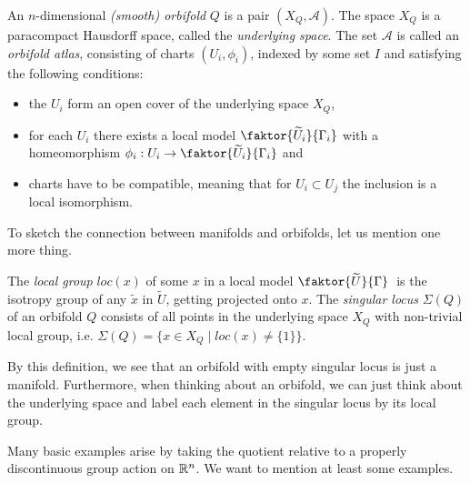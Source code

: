 \begin{definition}
    An \(n\)-dimensional \emph{(smooth) orbifold} \(Q\) is a pair \((X_Q, \mathcal{A})\).
    The space \(X_Q\) is a paracompact Hausdorff space, called the \emph{underlying space}.
    The set \(\mathcal{A}\) is called an \emph{orbifold atlas}, consisting of charts \((U_i, \phi_i)\), indexed by some set \(I\) and satisfying the following conditions:
    \begin{itemize}
        \item the \(U_i\) form an open cover of the underlying space \(X_Q\),\vspace*{-.7em}
        \item for each \(U_i\) there exists a local model \(\faktor{\widetilde{U}_i}{\Gamma_i}\) with a homeomorphism \(\phi_i : U_i \to \faktor{\widetilde{U}_i}{\Gamma_i}\) and
        \item charts have to be compatible, meaning that for \(U_i \subset U_j\) the inclusion is a local isomorphism.
    \end{itemize}
\end{definition}

To sketch the connection between manifolds and orbifolds, let us mention one more thing.

\begin{definition}
    The \emph{local group} \(loc(x)\) of some \(x\) in a local model \(\faktor{\widetilde{U}}{\Gamma}\;\) is the isotropy group of any \(\widetilde{x}\) in \(\widetilde{U}\), getting projected onto \(x\).
    The \emph{singular locus} \(\Sigma (Q)\) of an orbifold \(Q\) consists of all points in the underlying space \(X_Q\) with non-trivial local group, i.e. \(\Sigma(Q) = \{x \in X_Q \;\vert\; loc(x) \neq \{1\}\}\).
\end{definition}

By this definition, we see that an orbifold with empty singular locus is just a manifold.
Furthermore, when thinking about an orbifold, we can just think about the underlying space and label each element in the singular locus by its local group.

Many basic examples arise by taking the quotient relative to a properly discontinuous group action on \(\mathbb{R}^n\).
We want to mention at least some examples.

